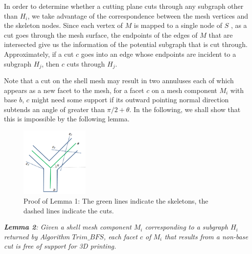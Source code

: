 In order to determine whether a cutting plane cuts through any subgraph other than $H_i$, we take advantage of the correspondence between the mesh vertices and the skeleton nodes. Since each vertex of $M$ is mapped to a single node of $S$ \cite{AuTCCL08}, as a cut goes through the mesh surface, the endpoints of the edges of $M$ that are intersected give us the information of the potential subgraph that is cut through. Approximately, if a cut $c$ goes into an edge whose endpoints are incident to a subgraph $H_j$, then $c$ cuts through $H_j$.


{{Note that a cut on the shell mesh may result in two annuluses each of which appears as a new facet to the mesh, for a facet $c$ on a mesh component $M_i$ with base $b$, $c$ might need some support if its outward pointing normal direction subtends an angle of greater than $\pi/2 + \theta$. In the following, we shall show that this is impossible by the following lemma.

\begin{figure}[b]
  \centering
  \includegraphics[width=0.3\textwidth]{figs/nonbasecut.png}
  \caption{\label{fig:nonbasecut}%
           Proof of Lemma 1: The green lines indicate the skeletons, the dashed lines indicate the cuts.}
\end{figure}


\emph{\textbf{Lemma 2}: Given a shell mesh component $M_i$ corresponding to a subgraph $H_i$ returned by Algorithm $Trim\_BFS$, each facet $c$ of $M_i$ that results from a non-base cut is free of support for 3D printing.}

}}
